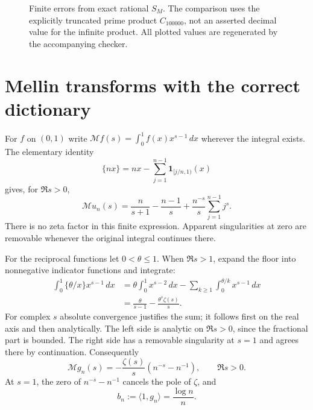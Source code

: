 \documentclass[11pt]{amsart}
\theoremstyle{definition}
\begin{document}
\begin{figure}[tb]
\centering
{}
\caption{Finite errors from exact rational $S_M$. The comparison uses
the explicitly truncated prime product $C_{100000}$, not an asserted
decimal value for the infinite product. All plotted values are regenerated
by the accompanying checker.}
\end{figure}

\section{Mellin transforms with the correct dictionary}
For $f$ on $(0,1)$ write
$\mathcal Mf(s)=\int_0^1 f(x)x^{s-1}\,dx$ wherever the integral exists.
The elementary identity
\[
 \{nx\}=nx-\sum_{j=1}^{n-1}\boldsymbol1_{[j/n,1)}(x)
\]
gives, for $\Re s>0$,
\begin{equation}\label{eq:ordinarymellin}
 \mathcal Mu_n(s)=\frac n{s+1}-\frac{n-1}s
                  +\frac{n^{-s}}s\sum_{j=1}^{n-1}j^s.
\end{equation}
There is no zeta factor in this finite expression. Apparent singularities
at zero are removable whenever the original integral continues there.

For the reciprocal functions let $0<\theta\le1$. When $\Re s>1$,
expand the floor into nonnegative indicator functions and integrate:
\begin{align*}
 \int_0^1\{\theta/x\}x^{s-1}\,dx
 &=\theta\int_0^1x^{s-2}\,dx
       -\sum_{k\ge1}\int_0^{\theta/k}x^{s-1}\,dx\\
 &=\frac\theta{s-1}-\frac{\theta^s\zeta(s)}s.
\end{align*}
For complex $s$ absolute convergence justifies the sum; it follows
first on the real axis and then analytically. The left side is analytic
on $\Re s>0$, since the fractional part is bounded. The right side
has a removable singularity at $s=1$ and agrees there by continuation.
Consequently
\begin{equation}\label{eq:reciprocalmellin}
 \mathcal Mg_n(s)=-\frac{\zeta(s)}s(n^{-s}-n^{-1}),\qquad \Re s>0.
\end{equation}
At $s=1$, the zero of $n^{-s}-n^{-1}$ cancels the pole of $\zeta$,
and
\begin{equation}\label{eq:bn}
 b_n:=\langle1,g_n\rangle=\frac{\log n}{n}.
\end{equation}
\end{document}
